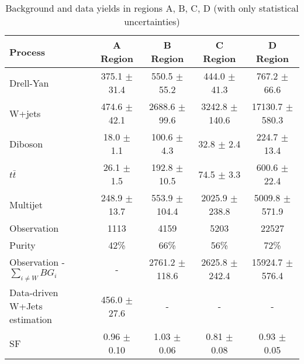 \begin{table}[ht]
\begin{center}
 \caption{Background and data yields in regions A, B, C, D (with only statistical uncertainties)\label{tab:WJetsTable}}
 \begin{tabular}{| l | c | c | c | c |}
 \hline
      Process          & A Region           & B Region               & C Region              & D Region             \\ \hline
      Drell-Yan        & 375.1 $\pm$ 31.4   & 550.5 $\pm$ 55.2       & 444.0 $\pm$ 41.3      & 767.2 $\pm$ 66.6     \\
      W+jets           & 474.6 $\pm$ 42.1   & 2688.6 $\pm$ 99.6      & 3242.8 $\pm$ 140.6    & 17130.7 $\pm$ 580.3  \\
      Diboson          & 18.0 $\pm$ 1.1     & 100.6 $\pm$ 4.3        & 32.8 $\pm$ 2.4        & 224.7 $\pm$ 13.4     \\
      $t\bar{t}$       & 26.1 $\pm$ 1.5     & 192.8 $\pm$ 10.5       & 74.5 $\pm$ 3.3        & 600.6 $\pm$ 22.4     \\
      Multijet         & 248.9  $\pm$ 13.7  & 553.9 $\pm$ 104.4      & 2025.9 $\pm$ 238.8    & 5009.8 $\pm$ 571.9   \\
      Observation      & 1113               & 4159                   & 5203                  & 22527                \\ \hline
      Purity           & 42\%               & 66\%                   & 56\%                  & 72\%                 \\
Observation - $\sum\limits_{i\neq W} BG_{i}$& - & 2761.2 $\pm$ 118.6 & 2625.8 $\pm$ 242.4    & 15924.7 $\pm$ 576.4  \\
Data-driven W+Jets estimation & 456.0 $\pm$ 27.6 & -                 &  -                    & -                    \\
     SF                &  0.96 $\pm$ 0.10   & 1.03 $\pm$ 0.06        & 0.81 $\pm$ 0.08       & 0.93 $\pm$ 0.05      \\

\end{tabular}
\end{center}
\end{table}
